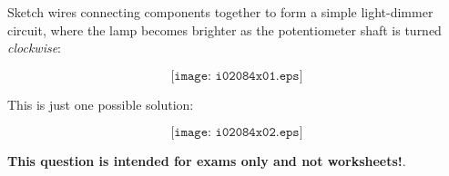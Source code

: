 

Sketch wires connecting components together to form a simple light-dimmer circuit, where the lamp becomes brighter as the potentiometer shaft is turned {\it clockwise}:

\vskip 30pt

$$\texttt{[image: i02084x01.eps]}$$







This is just one possible solution:

$$\texttt{[image: i02084x02.eps]}$$
 






{\bf This question is intended for exams only and not worksheets!}.



